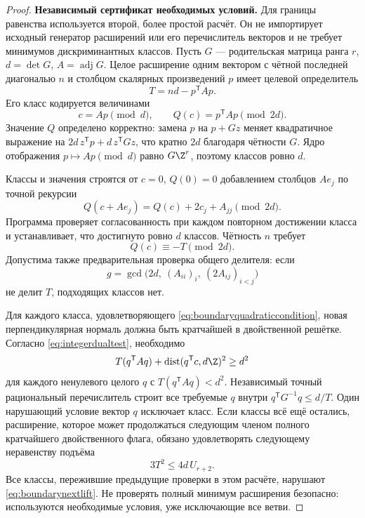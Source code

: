 \begin{proof}
\textbf{Независимый сертификат необходимых условий.}
Для границы равенства используется второй, более простой расчёт. Он не импортирует исходный генератор расширений или его перечислитель векторов и не требует минимумов дискриминантных классов. Пусть $G$ --- родительская матрица ранга $r$, $d=\det G$, $A=\operatorname{adj}G$. Целое расширение одним вектором с чётной последней диагональю $n$ и столбцом скалярных произведений $p$ имеет целевой определитель
\[
T=nd-p^{\mathsf T}Ap.
\]
Его класс кодируется величинами
\[
c=Ap\pmod d,\qquad Q(c)=p^{\mathsf T}Ap\pmod{2d}.
\]
Значение $Q$ определено корректно: замена $p$ на $p+Gz$ меняет квадратичное выражение на $2d\,z^{\mathsf T}p+d\,z^{\mathsf T}Gz$, что кратно $2d$ благодаря чётности $G$. Ядро отображения $p\mapsto Ap\pmod d$ равно $G\Z^r$, поэтому классов ровно $d$.

Классы и значения строятся от $c=0$, $Q(0)=0$ добавлением столбцов $Ae_j$ по точной рекурсии
\begin{equation}\label{eq:finitequadraticrecurrence}
Q(c+Ae_j)=Q(c)+2c_j+A_{jj}\pmod{2d}.
\end{equation}
Программа проверяет согласованность при каждом повторном достижении класса и устанавливает, что достигнуто ровно $d$ классов. Чётность $n$ требует
\begin{equation}\label{eq:boundaryquadraticcondition}
Q(c)\equiv-T\pmod{2d}.
\end{equation}
Допустима также предварительная проверка общего делителя: если
\[
g=\gcd\bigl(2d,\ (A_{ii})_i,\ (2A_{ij})_{i<j}\bigr)
\]
не делит $T$, подходящих классов нет.

Для каждого класса, удовлетворяющего \eqref{eq:boundaryquadraticcondition}, новая перпендикулярная нормаль должна быть кратчайшей в двойственной решётке. Согласно \eqref{eq:integerdualtest}, необходимо
\begin{equation}\label{eq:boundarydualcondition}
T(q^{\mathsf T}Aq)+\operatorname{dist}(q^{\mathsf T}c,d\Z)^2\ge d^2
\end{equation}
для каждого ненулевого целого $q$ с $T(q^{\mathsf T}Aq)<d^2$. Независимый точный рациональный перечислитель строит все требуемые $q$ внутри $q^{\mathsf T}G^{-1}q\le d/T$. Один нарушающий условие вектор $q$ исключает класс. Если классы всё ещё остались, расширение, которое может продолжаться следующим членом полного кратчайшего двойственного флага, обязано удовлетворять следующему неравенству подъёма
\begin{equation}\label{eq:boundarynextlift}
3T^2\le4d\,U_{r+2}.
\end{equation}
Все классы, пережившие предыдущие проверки в этом расчёте, нарушают \eqref{eq:boundarynextlift}. Не проверять полный минимум расширения безопасно: используются необходимые условия, уже исключающие все ветви.


\end{proof}
